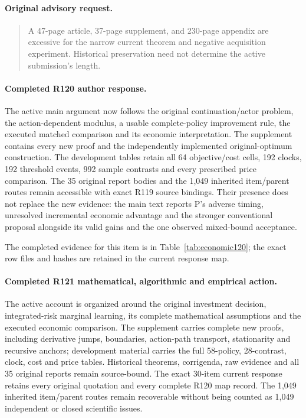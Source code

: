 \paragraph{Original advisory request.}
\begin{quote}
A 47-page article, 37-page supplement, and 230-page appendix are excessive for the narrow current theorem and negative acquisition experiment. Historical preservation need not determine the active submission's length.
\end{quote}

\paragraph{Completed R120 author response.}
The active main argument now follows the original continuation/actor problem, the action-dependent modulus, a usable complete-policy improvement rule, the executed matched comparison and its economic interpretation. The supplement contains every new proof and the independently implemented original-optimum construction. The development tables retain all 64 objective/cost cells, 192 clocks, 192 threshold events, 992 sample contrasts and every prescribed price comparison. The 35 original report bodies and the 1,049 inherited item/parent routes remain accessible with exact R119 source bindings. Their presence does not replace the new evidence: the main text reports P's adverse timing, unresolved incremental economic advantage and the stronger conventional proposal alongside its valid gains and the one observed mixed-bound acceptance.

The completed evidence for this item is in Table~\ref{tab:economic120}; the exact row files and hashes are retained in the current response map.

\paragraph{Completed R121 mathematical, algorithmic and empirical action.}
The active account is organized around the original investment decision, integrated-risk marginal learning, its complete mathematical assumptions and the executed economic comparison. The supplement carries complete new proofs, including derivative jumps, boundaries, action-path transport, stationarity and recursive anchors; development material carries the full 58-policy, 28-contrast, clock, cost and price tables. Historical theorems, corrigenda, raw evidence and all 35 original reports remain source-bound. The exact 30-item current response retains every original quotation and every complete R120 map record. The 1,049 inherited item/parent routes remain recoverable without being counted as 1,049 independent or closed scientific issues.

